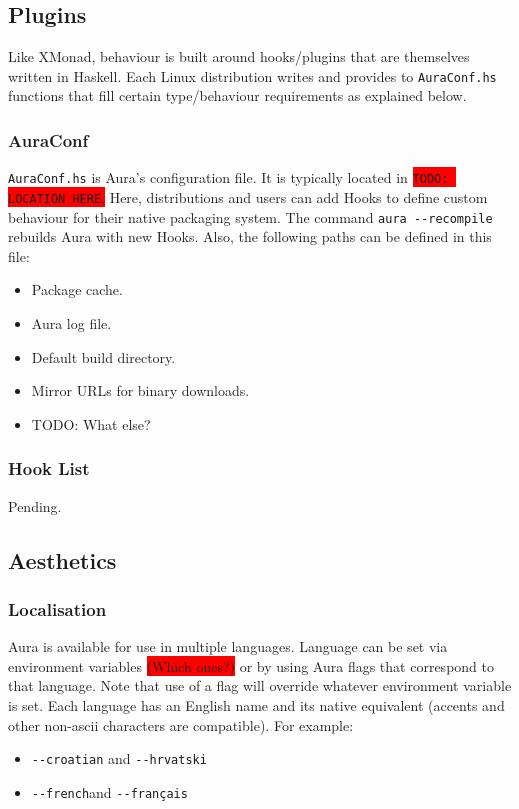 \documentclass{article}
\begin{document}

\subsection{Plugins}\label{plugins}
Like XMonad, behaviour is built around hooks/plugins that are themselves
written in Haskell. Each Linux distribution writes and provides to
\texttt{AuraConf.hs} functions that fill certain type/behaviour
requirements as explained below.

\subsubsection{AuraConf}\label{auraconf}
\texttt{AuraConf.hs} is Aura's configuration file. It is typically
located in \colorbox{Red}{\texttt{TODO: LOCATION HERE}.} Here, distributions
and users
can add Hooks to define custom behaviour for their native packaging
system. The command \colorbox{Apricot}{\texttt{aura -\/-recompile}}
rebuilds Aura with new
Hooks. Also, the following paths can be defined in this file:

\begin{itemize}
\itemsep1pt\parskip0pt
\item
  Package cache.
\item
  Aura log file.
\item
  Default build directory.
\item
  Mirror URLs for binary downloads.
\item
  TODO: What else?
\end{itemize}

\subsubsection{Hook List}\label{hook-list}

Pending.

\subsection{Aesthetics}\label{aesthetics}

\subsubsection{Localisation}
Aura is available for use in multiple languages. Language can be set
via environment variables \colorbox{Red}{(Which ones?)} or by using
Aura flags that correspond to that language. Note that use of a flag
will override whatever environment variable is set. Each language has an
English name and its native equivalent (accents and other non-ascii characters
are compatible). For example:
\begin{itemize}
  \item \colorbox{Apricot}{\texttt{-\/-croatian}} and
    \colorbox{Apricot}{\texttt{-\/-hrvatski}}
  \item \colorbox{Apricot}{\texttt{-\/-french}}and
    \colorbox{Apricot}{\texttt{-\/-français}}
\end{itemize}
\end{document}
